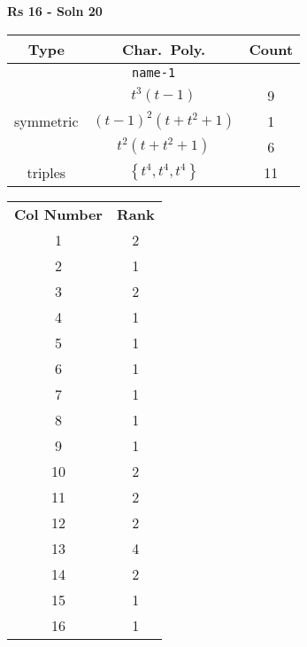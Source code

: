 \documentclass{article}
\begin{document}
    \textbf{Rs 16 - Soln 20}
    \begin{table}
    \begin{tabular}{|c|c|c|}
    \hline
    \textbf{Type} & \textbf{Char.~Poly.} & \textbf{Count} \\
    \hline \multicolumn{3}{|c|}{\texttt{name-1}} \\ \hline
    \multirow{3}{*}{symmetric}
    & $t^3(t - 1)$ & 9 \\
    & $(t - 1)^2(t + t^2 + 1)$ & 1 \\
    & $t^2(t + t^2 + 1)$ & 6 \\
    \hline
    \multirow{1}{*}{triples}
    & $\left\{t^4,t^4,t^4\right\}$ & 11 \\
    \hline
    \end{tabular}
    \end{table}
    \begin{table}
    \begin{tabular}{|c|c|}
    \hline
    \textbf{Col Number} & \textbf{Rank}\\
    1 & 2 \\ 
    2 & 1 \\ 
    3 & 2 \\ 
    4 & 1 \\ 
    5 & 1 \\ 
    6 & 1 \\ 
    7 & 1 \\ 
    8 & 1 \\ 
    9 & 1 \\ 
    10 & 2 \\ 
    11 & 2 \\ 
    12 & 2 \\ 
    13 & 4 \\ 
    14 & 2 \\ 
    15 & 1 \\ 
    16 & 1 \\ 
    \hline
    \end{tabular}
    \end{table}
    \newpage
\end{document}
